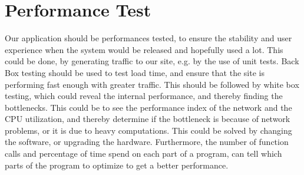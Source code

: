 \section{Performance Test}
Our application should be performances tested, to ensure the stability and user experience when the system would be released and hopefully used a lot. This could be done, by generating traffic to our site, e.g. by the use of unit tests. Back Box testing should be used to test load time, and ensure that the site is performing fast enough with greater traffic.
This should be followed by white box testing, which could reveal the internal performance, and thereby finding the bottlenecks.
This could be to see the performance index of the network and the CPU utilization, and thereby determine if the bottleneck is because of network problems, or it is due to heavy computations. This could be solved by changing the software, or upgrading the hardware.
Furthermore, the number of function calls and percentage of time spend on each part of a program, can tell which parts of the program to optimize to get a better performance. 